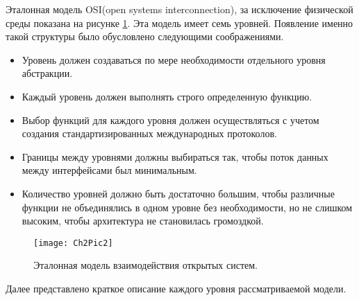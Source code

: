     Эталонная модель OSI(open systems interconnection), за исключение физической среды показана на рисунке \ref{Pic2}. Эта модель имеет семь уровней. Появление именно такой структуры было обусловлено следующими соображениями.
    \begin{itemize}
        \item Уровень должен создаваться по мере необходимости отдельного уровня абстракции.
        \item Каждый уровень должен выполнять строго определенную функцию.
        \item Выбор функций для каждого уровня должен осуществляться с учетом создания стандартизированных международных протоколов.
        \item Границы между уровнями должны выбираться так, чтобы поток данных между интерфейсами был минимальным.
        \item Количество уровней должно быть достаточно большим, чтобы различные функции не объединялись в одном уровне без необходимости, но не слишком высоким, чтобы архитектура не становилась громоздкой.
    \end{itemize}

    \begin{figure}[H]\center
        \texttt{[image: Ch2Pic2]}
        \caption{Эталонная модель взаимодействия открытых систем.} \label{Pic2}
    \end{figure}

    Далее представлено краткое описание каждого уровня рассматриваемой модели.

